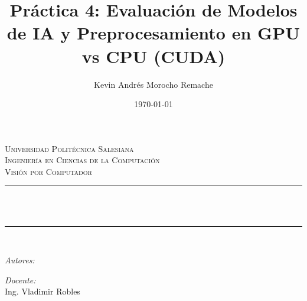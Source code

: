 \documentclass[12pt]{article}
\title{Práctica 4: Evaluación de Modelos de IA y Preprocesamiento en GPU vs CPU (CUDA)}		%
\author{Kevin Andrés Morocho Remache}	%
\date{\today}							%
\makeatletter
\let\thetitle\@title
\let\theauthor\@author
\let\thedate\@date
\makeatother
\begin{document}
\renewcommand{\listtablename}{Lista de Tablas}
\renewcommand{\tablename}{Tabla}
\renewcommand{\listfigurename}{Lista de Figuras}
\renewcommand{\figurename}{Figura }

\begin{titlepage}
	\centering
    \vspace*{1.0cm}
    \textsc{\LARGE Universidad Politécnica Salesiana}\\[2.0 cm]
	\textsc{\Large Ingeniería en Ciencias de la Computación}\\[0.5 cm]
	\textsc{\large Visión por Computador}\\[0.5 cm]
	\rule{\linewidth}{0.2 mm} \\[0.4 cm]
	{ \huge \bfseries \thetitle}\\
	\rule{\linewidth}{0.2 mm} \\[1.5 cm]
	
 \begin{flushleft} \large
    \emph{Autores:}\\
	\theauthor 
 \end{flushleft}
 
  \begin{flushleft} \large
    \emph{Docente:}\\
	Ing. Vladimir Robles \\
  \end{flushleft}
  
  \vfill

  {\large \thedate}

\end{titlepage}


\end{document}
